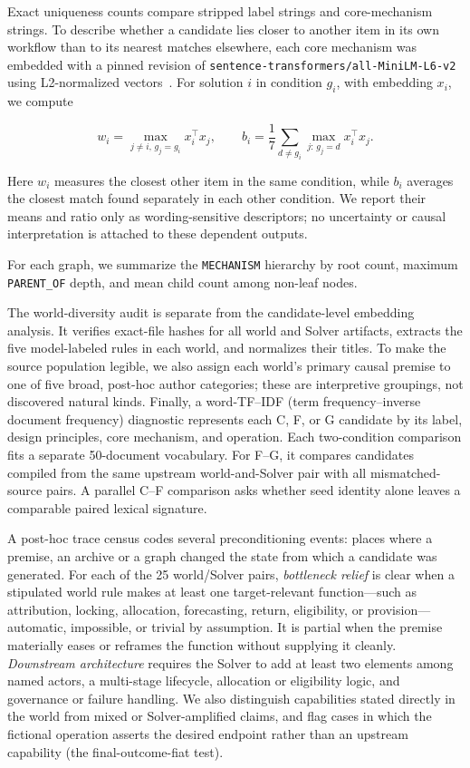 \documentclass[11pt,a4paper]{article}
\begin{document}
Exact uniqueness counts compare stripped label strings and core-mechanism strings. To describe whether a candidate lies closer to another item in its own workflow than to its nearest matches elsewhere, each core mechanism was embedded with a pinned revision of \texttt{sentence-transformers/all-MiniLM-L6-v2} using L2-normalized vectors~\cite{reimers2019sbert,sentenceTransformersMiniLM}. For solution $i$ in condition $g_i$, with embedding $x_i$, we compute

\begin{equation}
w_i=\max_{j\neq i,\,g_j=g_i} x_i^\top x_j,
\qquad
b_i=\frac{1}{7}\sum_{d\neq g_i}\max_{j:\,g_j=d}x_i^\top x_j.
\label{eq:embedding}
\end{equation}

Here $w_i$ measures the closest other item in the same condition, while $b_i$ averages the closest match found separately in each other condition. We report their means and ratio only as wording-sensitive descriptors; no uncertainty or causal interpretation is attached to these dependent outputs.

For each graph, we summarize the \texttt{MECHANISM} hierarchy by root count, maximum \texttt{PARENT\_OF} depth, and mean child count among non-leaf nodes.

The world-diversity audit is separate from the candidate-level embedding analysis. It verifies exact-file hashes for all world and Solver artifacts, extracts the five model-labeled rules in each world, and normalizes their titles. To make the source population legible, we also assign each world's primary causal premise to one of five broad, post-hoc author categories; these are interpretive groupings, not discovered natural kinds. Finally, a word-TF--IDF (term frequency--inverse document frequency) diagnostic represents each C, F, or G candidate by its label, design principles, core mechanism, and operation. Each two-condition comparison fits a separate 50-document vocabulary. For F--G, it compares candidates compiled from the same upstream world-and-Solver pair with all mismatched-source pairs. A parallel C--F comparison asks whether seed identity alone leaves a comparable paired lexical signature.

A post-hoc trace census codes several preconditioning events: places where a premise, an archive or a graph changed the state from which a candidate was generated. For each of the 25 world/Solver pairs, \emph{bottleneck relief} is clear when a stipulated world rule makes at least one target-relevant function---such as attribution, locking, allocation, forecasting, return, eligibility, or provision---automatic, impossible, or trivial by assumption. It is partial when the premise materially eases or reframes the function without supplying it cleanly. \emph{Downstream architecture} requires the Solver to add at least two elements among named actors, a multi-stage lifecycle, allocation or eligibility logic, and governance or failure handling. We also distinguish capabilities stated directly in the world from mixed or Solver-amplified claims, and flag cases in which the fictional operation asserts the desired endpoint rather than an upstream capability (the final-outcome-fiat test).
\end{document}

